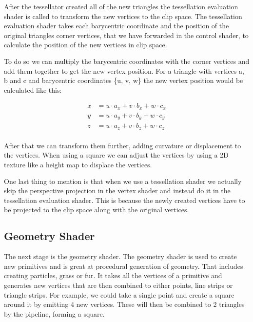 \documentclass[12pt]{report} \usepackage{preamble}
\begin{document}
After the tessellator created all of the new triangles the tessellation evaluation shader
is called to transform the new vertices to the clip space.
The tessellation evaluation shader takes each barycentric coordinate
and the position of the original triangles corner vertices, that we have forwarded in
the control shader, to calculate the position of the new vertices in clip space. \cite{tessellation}

To do so we can multiply the barycentric coordinates with the corner vertices
and add them together to get the new vertex position.
For a triangle with vertices a, b and c and barycentric coordinates \{u, v, w\}
the new vertex position would be calculated like this:

\[
	\begin{aligned}
		x & = u \cdot a_x + v \cdot b_x + w \cdot c_x \\
		y & = u \cdot a_y + v \cdot b_y + w \cdot c_y \\
		z & = u \cdot a_z + v \cdot b_z + w \cdot c_z \\
	\end{aligned}
\]

After that we can transform them further, adding curvature or displacement to the vertices.
When using a square we can adjust the vertices
by using a 2D texture like a height map to displace the vertices. \cite{tessellation}

One last thing to mention is that when we use a tessellation shader
we actually skip the perspective projection in the vertex shader and
instead do it in the tessellation evaluation shader.
This is because the newly created vertices have to be projected to the clip space
along with the original vertices. \cite{tessellation}

\subsection{Geometry Shader}

The next stage is the geometry shader. The geometry shader is used to create new
primitives and is great at procedural generation of geometry.
That includes creating particles, grass or fur. It takes all the vertices of a primitive
and generates new vertices that are then combined to
either points, line strips or triangle strips.
For example, we could take a single point and create a square around it by emitting 4 new vertices.
These will then be combined to 2 triangles by the pipeline, forming a square. \cite{geometry-shader}
\end{document}
